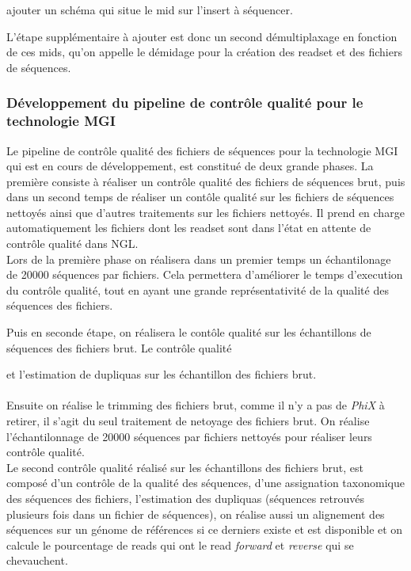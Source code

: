 ajouter un schéma qui situe le mid sur l'insert à séquencer.

L'étape supplémentaire à ajouter est donc un second démultiplaxage en fonction de ces mids, qu'on appelle le démidage pour la création des readset et des fichiers de séquences.

\subsubsection{Développement du pipeline de contrôle qualité pour le technologie MGI}
Le pipeline de contrôle qualité des fichiers de séquences pour la technologie MGI qui est en cours de développement, est constitué de deux grande phases. La première consiste à réaliser un contrôle qualité des fichiers de séquences brut, puis dans un second temps de réaliser un contôle qualité sur les fichiers de séquences nettoyés ainsi que d'autres traitements sur les fichiers nettoyés. Il prend en charge automatiquement les fichiers dont les readset sont dans l'état \og en attente de contrôle qualité\fg{} dans NGL.\\

Lors de la première phase on réalisera dans un premier temps un échantilonage de 20000 séquences par fichiers. Cela permettera d'améliorer le temps d'execution du contrôle qualité, tout en ayant une grande représentativité de la qualité des séquences des fichiers. 

Puis en seconde étape, on réalisera le contôle qualité sur les échantillons de séquences des fichiers brut. Le contrôle qualité 



et l'estimation de dupliquas sur les échantillon des fichiers brut.\\\\
 

Ensuite on réalise le trimming des fichiers brut, comme il n'y a pas de \emph{PhiX} à retirer, il s'agit du seul traitement de netoyage des fichiers brut. On réalise l'échantilonnage de 20000 séquences par fichiers nettoyés pour réaliser leurs contrôle qualité.\\

Le second contrôle qualité réalisé sur les échantillons des fichiers brut, est composé d'un contrôle de la qualité des séquences, d'une assignation taxonomique des séquences des fichiers, l'estimation des dupliquas (séquences retrouvés plusieurs fois dans un fichier de séquences), on réalise aussi un alignement des séquences sur un génome de références si ce derniers existe et est disponible et on calcule le pourcentage de reads qui ont le read \emph{forward} et \emph{reverse} qui se chevauchent.\\

